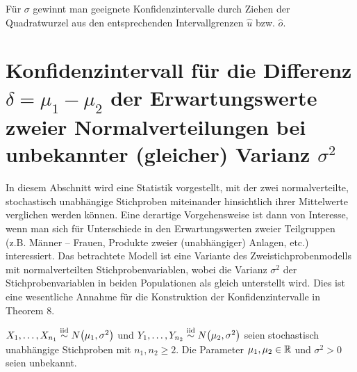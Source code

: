 \documentclass{lecture}
\begin{document}
    \begin{theorem}
        Für \(\sigma\) gewinnt man geeignete Konfidenzintervalle durch Ziehen der Quadratwurzel aus den entsprechenden Intervallgrenzen \(\hat{u}\) bzw. \(\hat{o}\).
    \end{theorem}


    \section*{Konfidenzintervall für die Differenz \(\delta = \mu_1 - \mu_2\) der Erwartungswerte zweier Normalverteilungen bei unbekannter (gleicher) Varianz \(\sigma^2\)}

    In diesem Abschnitt wird eine Statistik vorgestellt, mit der zwei normalverteilte, stochastisch unabhängige Stichproben miteinander hinsichtlich ihrer Mittelwerte verglichen werden können.
    Eine derartige Vorgehensweise ist dann von Interesse, wenn man sich für Unterschiede in den Erwartungswerten zweier Teilgruppen (z.B. Männer -- Frauen, Produkte zweier (unabhängiger) Anlagen, etc.) interessiert.
    Das betrachtete Modell ist eine Variante des Zweistichprobenmodells mit normalverteilten Stichprobenvariablen, wobei die Varianz \(\sigma^2\) der Stichprobenvariablen in beiden Populationen als gleich unterstellt wird.
    Dies ist eine wesentliche Annahme für die Konstruktion der Konfidenzintervalle in Theorem 8.

    \(X_1, \ldots, X_{n_1} \stackrel{\text{iid}}{\sim} N\parentheses*{\mu_1, \sigma^2}\) und \(Y_1, \ldots, Y_{n_2} \stackrel{\text{iid}}{\sim} N\parentheses*{\mu_2, \sigma^2}\) seien stochastisch unabhängige Stichproben mit \(n_1, n_2 \ge 2\).
    Die Parameter \(\mu_1, \mu_2 \in \mathbb{R}\) und \(\sigma^2 > 0\) seien unbekannt.
\end{document}
